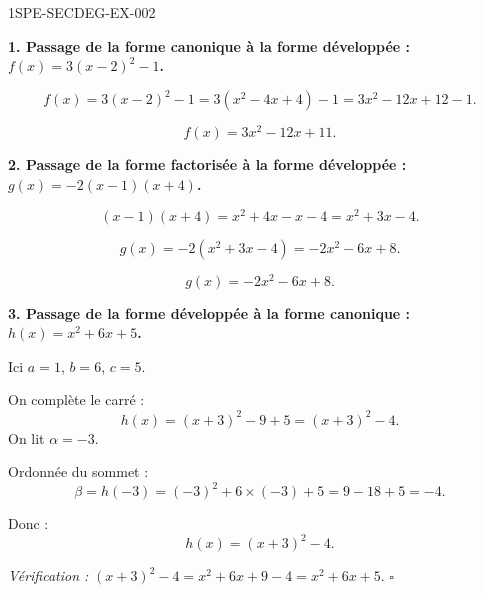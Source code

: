 \begin{corrige}{1SPE-SECDEG-EX-002}

\textbf{1. Passage de la forme canonique à la forme développée : $f(x) = 3(x-2)^2 - 1$.}


\[f(x) = 3(x-2)^2 - 1 = 3(x^2 - 4x + 4) - 1 = 3x^2 - 12x + 12 - 1.\]

\[\boxed{f(x) = 3x^2 - 12x + 11.}\]

\medskip
\textbf{2. Passage de la forme factorisée à la forme développée : $g(x) = -2(x-1)(x+4)$.}


\[(x-1)(x+4) = x^2 + 4x - x - 4 = x^2 + 3x - 4.\]

\[g(x) = -2(x^2 + 3x - 4) = -2x^2 - 6x + 8.\]

\[\boxed{g(x) = -2x^2 - 6x + 8.}\]

\medskip
\textbf{3. Passage de la forme développée à la forme canonique : $h(x) = x^2 + 6x + 5$.}


Ici $a = 1$, $b = 6$, $c = 5$.

On complète le carré :
\[h(x)=(x+3)^2-9+5=(x+3)^2-4.\]
On lit $\alpha=-3$.

Ordonnée du sommet :
\[\beta = h(-3) = (-3)^2 + 6 \times (-3) + 5 = 9 - 18 + 5 = -4.\]

Donc :
\[\boxed{h(x) = (x + 3)^2 - 4.}\]

\textit{Vérification :} $(x+3)^2 - 4 = x^2 + 6x + 9 - 4 = x^2 + 6x + 5$. \hfill $\square$

\end{corrige}
